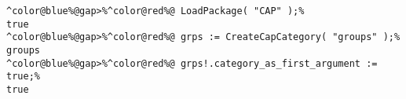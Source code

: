 \begin{Verbatim}[commandchars=^@\%,frame=single]
^color@blue%@gap>%^color@red%@ LoadPackage( "CAP" );%
true
^color@blue%@gap>%^color@red%@ grps := CreateCapCategory( "groups" );%
groups
^color@blue%@gap>%^color@red%@ grps!.category_as_first_argument := true;%
true
\end{Verbatim}
